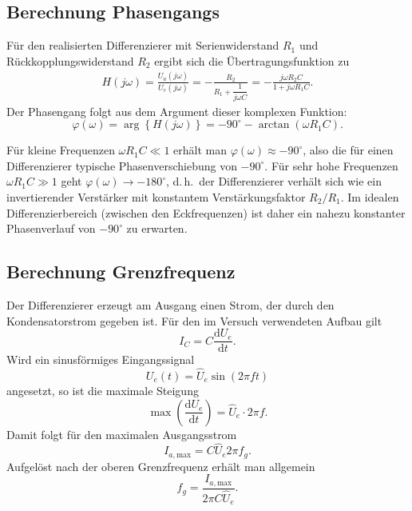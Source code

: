 \subsection{Berechnung Phasengangs}

Für den realisierten Differenzierer mit Serienwiderstand $R_1$ und
Rückkopplungswiderstand $R_2$ ergibt sich die Übertragungsfunktion zu
\begin{gather}
	H(j\omega)
	= \frac{U_a(j\omega)}{U_e(j\omega)}
	= - \frac{R_2}{R_1 + \dfrac{1}{j\omega C}}
	= - \frac{j\omega R_2 C}{1 + j\omega R_1 C}.
\end{gather}
Der Phasengang folgt aus dem Argument dieser komplexen Funktion:
\begin{equation}
	\varphi(\omega)
	= \arg\!\left\{ H(j\omega) \right\}
	= -90^\circ - \arctan(\omega R_1 C).
\end{equation}

Für kleine Frequenzen $\omega R_1 C \ll 1$ erhält man
$\varphi(\omega) \approx -90^\circ$,
also die für einen Differenzierer typische Phasenverschiebung von $-90^\circ$.
Für sehr hohe Frequenzen $\omega R_1 C \gg 1$ geht
$\varphi(\omega) \rightarrow -180^\circ$,
d.\,h.\ der Differenzierer verhält sich wie ein invertierender Verstärker mit konstantem
Verstärkungsfaktor $R_2 / R_1$.
Im idealen Differenzierbereich (zwischen den Eckfrequenzen) ist daher ein nahezu
konstanter Phasenverlauf von $-90^\circ$ zu erwarten.

\subsection{Berechnung Grenzfrequenz}\label{sec:2-3}

Der Differenzierer erzeugt am Ausgang einen Strom, der durch den Kondensatorstrom
gegeben ist. Für den im Versuch verwendeten Aufbau gilt
\begin{equation}
	I_C = C \frac{\mathrm{d}U_e}{\mathrm{d}t}.
\end{equation}
Wird ein sinusförmiges Eingangssignal
\begin{equation}
	U_e(t) = \hat{U}_e \sin(2\pi f t)
\end{equation}
angesetzt, so ist die maximale Steigung
\begin{equation}
	\max\!\left( \frac{\mathrm{d}U_e}{\mathrm{d}t} \right)
	= \hat{U}_e \cdot 2\pi f.
\end{equation}
Damit folgt für den maximalen Ausgangsstrom
\begin{equation}
	I_{a,\mathrm{max}}
	= C \hat{U}_e 2\pi f_g.
\end{equation}
Aufgelöst nach der oberen Grenzfrequenz erhält man allgemein
\begin{equation}
	f_g = \frac{I_{a,\mathrm{max}}}{2\pi C \hat{U}_e}.
\end{equation}

